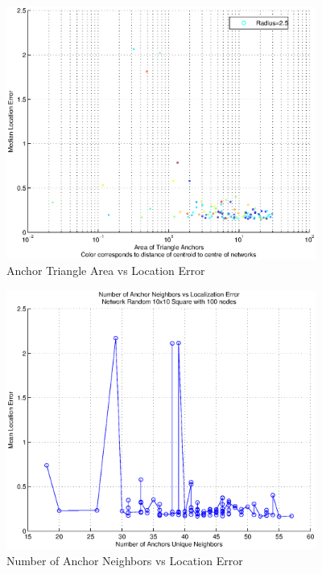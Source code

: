 \begin{figure}
  \centering
    \includegraphics[width=4in]{figures/AnchorTriangleAreaVsError-Random-10x10-Square-with-100-nodes.eps}
    \caption{Anchor Triangle Area vs Location Error}
    \label{fig:Area}
\end{figure}

\begin{figure}
  \centering
    \includegraphics[width=4in]{figures/AnchorNeighborsVsError-Random-10x10-Square-with-100-nodes.eps}
    \caption{Number of Anchor Neighbors vs Location Error}
    \label{fig:Neighbors1}
\end{figure}
